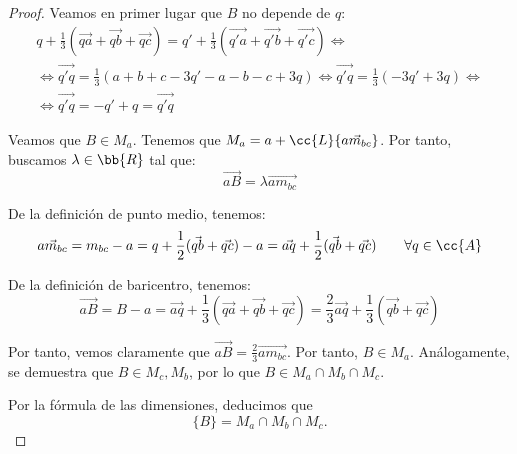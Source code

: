 \begin{proof}
    Veamos en primer lugar que $B$ no depende de $q$:
    \begin{multline*}
        q + \frac{1}{3}\left(\vec{qa} + \vec{qb} + \vec{qc}\right) = q' + \frac{1}{3}\left(\vec{q'a} + \vec{q'b} + \vec{q'c}\right) 
        \Longleftrightarrow \\
        \Longleftrightarrow
        \vec{q'q} = \frac{1}{3}\left(a+b+c-3q'-a-b-c+3q\right)
        \Longleftrightarrow
        \vec{q'q} = \frac{1}{3}\left(-3q'+3q\right)
        \Longleftrightarrow\\ \Longleftrightarrow
        \vec{q'q} = -q'+q = \vec{q'q}
    \end{multline*}

    Veamos que $B\in M_a$. Tenemos que $M_a = a + \cc{L}\{\vec{am_{bc}}\}$. Por tanto, buscamos $\lambda\in \bb{R}$ tal que:
    \begin{equation*}
        \vec{aB} = \lambda \vec{am_{bc}}
    \end{equation*}

    De la definición de punto medio, tenemos:
    \begin{equation*}
        \vec{am_{bc}} = m_{bc} - a = q+\frac{1}{2}(\vec{qb} + \vec{qc}) -a = \vec{aq}+\frac{1}{2}(\vec{qb} + \vec{qc}) \qquad \forall q\in \cc{A}
    \end{equation*}

    De la definición de baricentro, tenemos:
    \begin{equation*}
        \vec{aB} = B-a = \vec{aq} + \frac{1}{3}\left(\vec{qa} + \vec{qb} + \vec{qc}\right)
        = \frac{2}{3}\vec{aq} + \frac{1}{3}(\vec{qb} + \vec{qc})
    \end{equation*}

    Por tanto, vemos claramente que $\vec{aB}=\frac{2}{3}\vec{am_{bc}}$. Por tanto, $B\in M_a$. Análogamente, se demuestra que $B\in M_c,M_b$, por lo que $B\in M_a\cap M_b\cap M_c$.

    Por la fórmula de las dimensiones, deducimos que $$\{B\}=M_a\cap M_b\cap M_c.$$
\end{proof}


